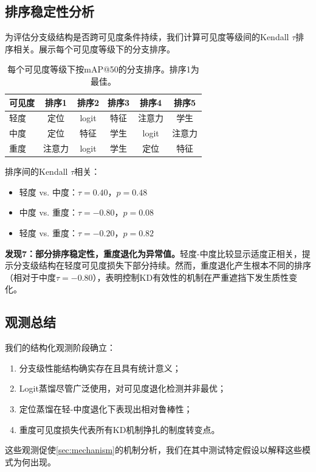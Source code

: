 \subsection{排序稳定性分析}

为评估分支级结构是否跨可见度条件持续，我们计算可见度等级间的Kendall $\tau$排序相关。展示每个可见度等级下的分支排序。

\begin{table}[htbp]
\centering
\caption{每个可见度等级下按mAP@50的分支排序。排序1为最佳。}
\label{tab:rankings}
\begin{tabular}{@{}lccccc@{}}
\toprule
可见度 & 排序1 & 排序2 & 排序3 & 排序4 & 排序5 \\
\midrule
轻度 & 定位 & logit & 特征 & 注意力 & 学生 \\
中度 & 定位 & 特征 & 学生 & logit & 注意力 \\
重度 & 注意力 & logit & 学生 & 定位 & 特征 \\
\bottomrule
\end{tabular}
\end{table}

排序间的Kendall $\tau$相关：
\begin{itemize}
    \item 轻度 vs. 中度：$\tau = 0.40$，$p = 0.48$
    \item 中度 vs. 重度：$\tau = -0.80$，$p = 0.08$
    \item 轻度 vs. 重度：$\tau = -0.20$，$p = 0.82$
\end{itemize}

\textbf{发现7：部分排序稳定性，重度退化为异常值。}轻度-中度比较显示适度正相关，提示分支级结构在轻度可见度损失下部分持续。然而，重度退化产生根本不同的排序（相对于中度$\tau = -0.80$），表明控制KD有效性的机制在严重遮挡下发生质性变化。

\subsection{观测总结}

我们的结构化观测阶段确立：
\begin{enumerate}
    \item 分支级性能结构确实存在且具有统计意义；
    \item Logit蒸馏尽管广泛使用，对可见度退化检测并非最优；
    \item 定位蒸馏在轻-中度退化下表现出相对鲁棒性；
    \item 重度可见度损失代表所有KD机制挣扎的制度转变点。
\end{enumerate}

这些观测促使\cref{sec:mechanism}的机制分析，我们在其中测试特定假设以解释这些模式为何出现。
